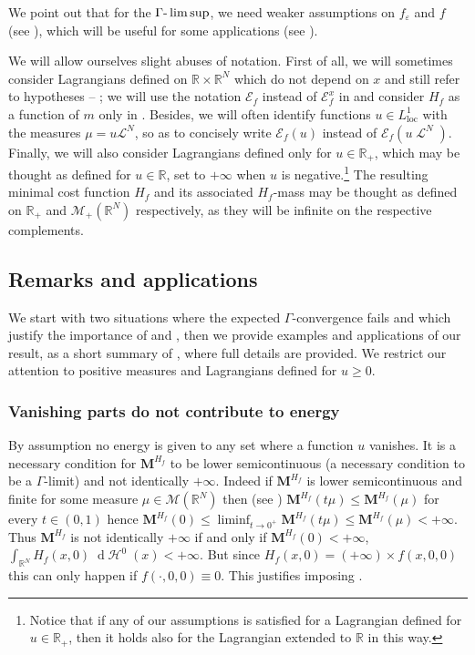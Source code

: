 \documentclass[JEP,XML,SOM,Unicode,published]{cedram}
\theoremstyle{plain}
\theoremstyle{definition}
\newcommand{\dd}{\mathop{}\mathopen{}\mathrm{d}}
\newcommand{\R}{\mathbb{R}}
\newcommand{\Mspace}{\mathscr{M}}
\newcommand{\ener}{\mathcal{E}}
\newcommand{\mass}{\boldsymbol{M}}
\newcommand{\loc}{\mathrm{loc}}
\newcommand{\eps}{\varepsilon}
\DeclareMathOperator{\hdm}{\mathcal{H}}
\DeclareMathOperator{\lbm}{\mathcal{L}}
\begin{document}
We point out that for the \(\Gamma\textup{-}\limsup\), we need weaker assumptions on \(f_\eps\) and \(f\) (see ), which will be useful for some applications (see ).

We will allow ourselves slight abuses of notation. First of all, we will sometimes consider Lagrangians defined on $\R \times \R^N$ which do not depend on $x$ and still refer to hypotheses -- ; we will use the notation $\ener_f$ instead of $\ener_f^x$ in  and consider $H_f$ as a function of $m$ only in . Besides, we will often identify functions $u\in L^1_{\loc}$ with the measures $\mu = u\mathcal L^N$, so as to concisely write $\ener_f(u)$ instead of $\ener_f(u\lbm^N)$. Finally, we will also consider Lagrangians defined only for $u\in \R_+$, which may be thought as defined for $u\in \R$, set to $+\infty$ when $u$ is negative.\footnote{Notice that if any of our assumptions is satisfied for a Lagrangian defined for $u \in \R_+$, then it holds also for the Lagrangian extended to $\R$ in this way.} The resulting minimal cost function $H_f$ and its associated $H_f$-mass may be thought as defined on $\R_+$ and $\Mspace_+(\R^N)$ respectively, as they will be infinite on the respective complements.

\subsection{Remarks and applications}\label{sectionExamplesIntroduction}

We start with two situations where the expected $\Gamma$-convergence fails and which justify the importance of  and , then we provide examples and applications of our result, as a short summary of , where full details are provided. We restrict our attention to positive measures and Lagrangians defined for $u\geq 0$.

\subsubsection*{Vanishing parts do not contribute to energy}
By assumption  no energy is given to any set where a function $u$ vanishes. It is a necessary condition for $\mass^{H_f}$ to be lower semicontinuous (a necessary condition to be a $\Gamma$-limit) and not identically $+\infty$. Indeed if $\mass^{H_f}$ is lower semicontinuous and finite for some measure $\mu \in \Mspace(\R^N)$ then (see ) $\mass^{H_f}(t \mu) \leq \mass^{H_f}(\mu)$ for every $t\in (0,1)$ hence $\mass^{H_f}(0) \leq \liminf_{t\to 0^+} \mass^{H_f}(t\mu) \leq \mass^{H_f}(\mu) <+\infty$. Thus $\mass^{H_f}$ is not identically $+\infty$ if and only if $\mass^{H_f}(0) < +\infty$, \ie $\int_{\R^N} H_f(x,0)\dd\hdm^0(x) < +\infty$. But since $H_f(x,0) = (+\infty) \times f(x,0,0)$ this can only happen if $f(\cdot,0,0) \equiv 0$. This justifies imposing .
\end{document}
